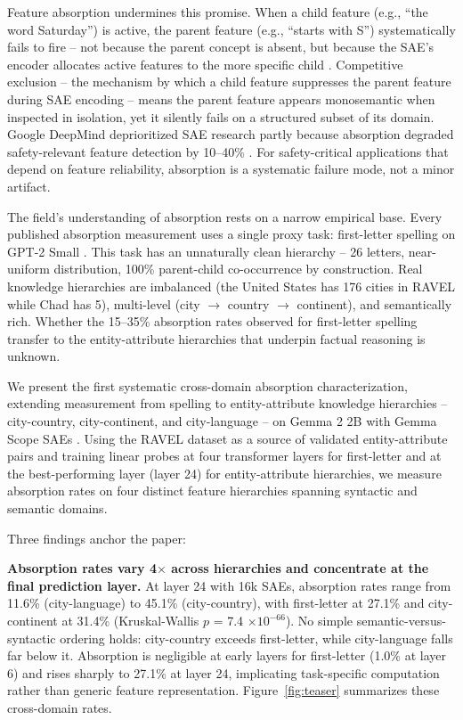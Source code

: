 \documentclass{article}
\begin{document}
Feature absorption undermines this promise. When a child feature (e.g., ``the word Saturday'') is active, the parent feature (e.g., ``starts with S'') systematically fails to fire -- not because the parent concept is absent, but because the SAE's encoder allocates active features to the more specific child \citep{chanin2024absorption}. Competitive exclusion -- the mechanism by which a child feature suppresses the parent feature during SAE encoding -- means the parent feature appears monosemantic when inspected in isolation, yet it silently fails on a structured subset of its domain. Google DeepMind deprioritized SAE research partly because absorption degraded safety-relevant feature detection by 10--40\% \citep{karvonen2025saebench}. For safety-critical applications that depend on feature reliability, absorption is a systematic failure mode, not a minor artifact.

The field's understanding of absorption rests on a narrow empirical base. Every published absorption measurement uses a single proxy task: first-letter spelling on GPT-2 Small \citep{chanin2024absorption}. This task has an unnaturally clean hierarchy -- 26 letters, near-uniform distribution, 100\% parent-child co-occurrence by construction. Real knowledge hierarchies are imbalanced (the United States has 176 cities in RAVEL while Chad has 5), multi-level (city $\to$ country $\to$ continent), and semantically rich. Whether the 15--35\% absorption rates observed for first-letter spelling transfer to the entity-attribute hierarchies that underpin factual reasoning is unknown.

We present the first systematic cross-domain absorption characterization, extending measurement from spelling to entity-attribute knowledge hierarchies -- city-country, city-continent, and city-language -- on Gemma 2 2B with Gemma Scope SAEs \citep{lieberum2024gemma}. Using the RAVEL dataset \citep{huang2024ravel} as a source of validated entity-attribute pairs and training linear probes at four transformer layers for first-letter and at the best-performing layer (layer 24) for entity-attribute hierarchies, we measure absorption rates on four distinct feature hierarchies spanning syntactic and semantic domains.

Three findings anchor the paper:

\textbf{Absorption rates vary 4$\times$ across hierarchies and concentrate at the final prediction layer.} At layer 24 with 16k SAEs, absorption rates range from 11.6\% (city-language) to 45.1\% (city-country), with first-letter at 27.1\% and city-continent at 31.4\% (Kruskal-Wallis $p$ = 7.4 $\times 10^{-66}$). No simple semantic-versus-syntactic ordering holds: city-country exceeds first-letter, while city-language falls far below it. Absorption is negligible at early layers for first-letter (1.0\% at layer 6) and rises sharply to 27.1\% at layer 24, implicating task-specific computation rather than generic feature representation. Figure~\ref{fig:teaser} summarizes these cross-domain rates.
\end{document}
